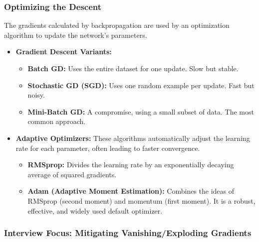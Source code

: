 \documentclass[11pt,a4paper]{article}
\begin{document}
\subsubsection{Optimizing the Descent}

The gradients calculated by backpropagation are used by an optimization algorithm to update the network's parameters.
\begin{itemize}
    \item \textbf{Gradient Descent Variants:}
    \begin{itemize}
        \item \textbf{Batch GD:} Uses the entire dataset for one update. Slow but stable.
        \item \textbf{Stochastic GD (SGD):} Uses one random example per update. Fast but noisy.
        \item \textbf{Mini-Batch GD:} A compromise, using a small subset of data. The most common approach.
    \end{itemize}
    \item \textbf{Adaptive Optimizers:} These algorithms automatically adjust the learning rate for each parameter, often leading to faster convergence.
    \begin{itemize}
        \item \textbf{RMSprop:} Divides the learning rate by an exponentially decaying average of squared gradients.
        \item \textbf{Adam (Adaptive Moment Estimation):} Combines the ideas of RMSprop (second moment) and momentum (first moment). It is a robust, effective, and widely used default optimizer.
    \end{itemize}
\end{itemize}

\subsubsection{Interview Focus: Mitigating Vanishing/Exploding Gradients}
\end{document}
